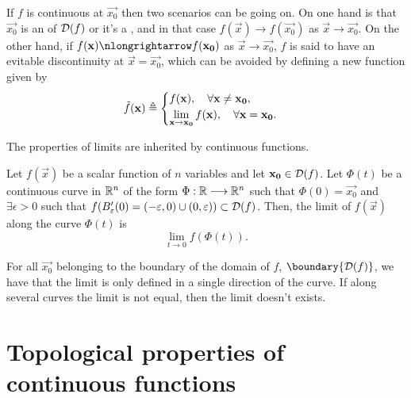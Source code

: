 \begin{note}
    If $f$ is continuous at $\vec{x_0}$ then two scenarios can be going on. On one hand is that $\vec{x_0}$ is an 
     of $\dom{f}$ or it's a , and in that case $f(\vec{x})\longrightarrow
    f(\vec{x_0})$ as $\vec{x}\longrightarrow\vec{x_0}$. On the other hand, if $f(\vec{x})\nlongrightarrow
    f(\vec{x_0})$ as $\vec{x}\longrightarrow\vec{x_0}$, $f$ is said to have an evitable discontinuity at $\vec{x} = \vec{x_0}$,
    which can be avoided by defining a new function given by
    \begin{equation}
        \tilde{f}(\vec{x})\bydef\begin{cases}
            f(\vec{x}),\quad\forall\vec{x}\neq\vec{x_0}, \\
            \lim_{\vec{x}\to\vec{x_0}} f(\vec{x}),\quad\forall\vec{x} = \vec{x_0}.
        \end{cases}
    \end{equation}
\end{note}

\begin{note}
    The properties of limits are inherited by continuous functions.
\end{note}

\begin{defn}
    Let $f(\vec{x})$ be a scalar function of $n$ variables and let $\vec{x_0}\in\dom{f}$. Let $\Phi(t)$ be a continuous
    curve in $\Rtn$ of the form $\appl{\Phi}{\R}{\Rtn}$ such that $\Phi(0) = \vec{x_0}$ and $\exists\epsilon > 0$ such that
    $f(B'_{\epsilon}\argp{0} = (-\epsilon, 0)\cup(0, \epsilon))\subset\dom{f}$. Then, the limit of $f(\vec{x})$ along the 
    curve $\Phi(t)$ is
    \begin{equation}
        \lim_{t\to 0} f(\Phi(t)).
    \end{equation}
\end{defn}

\begin{note}
    For all $\vec{x_0}$ belonging to the boundary of the domain of $f$, $\boundary{\dom{f}}$, we have that the limit is only
    defined in a single direction of the curve. If along several curves the limit is not equal, then the limit doesn't exists.
\end{note}

\section{Topological properties of continuous functions}

